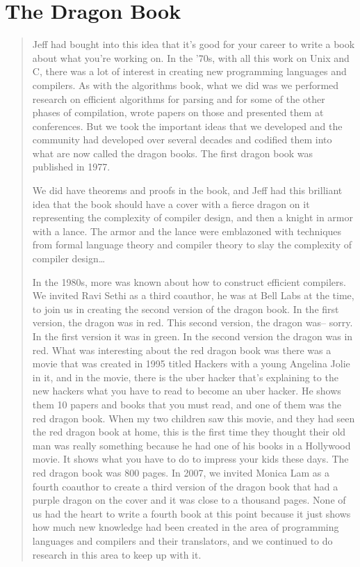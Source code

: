 
\section{The Dragon Book}

\begin{quotation}
Jeff had bought into this idea that it's good for your career to write a book about what you're working
on. In the '70s, with all this work on Unix and C, there was a lot of interest in creating new programming
languages and compilers. As with the algorithms book, what we did was we performed research on
efficient algorithms for parsing and for some of the other phases of compilation, wrote papers on those
and presented them at conferences. But we took the important ideas that we developed and the
community had developed over several decades and codified them into what are now called the dragon
books. The first dragon book was published in 1977. 

We did have theorems and proofs in the book, and Jeff had this brilliant idea that
the book should have a cover with a fierce dragon on it representing the complexity of compiler design,
and then a knight in armor with a lance. The armor and the lance were emblazoned with techniques from
formal language theory and compiler theory to slay the complexity of compiler design\dots

In the 1980s, more was known
about how to construct efficient compilers. We invited Ravi Sethi as a third coauthor, he was at Bell Labs
at the time, to join us in creating the second version of the dragon book. In the first version, the dragon
was in red. This second version, the dragon was-- sorry. In the first version it was in green. In the second
version the dragon was in red. What was interesting about the red dragon book was there was a movie
that was created in 1995 titled Hackers with a young Angelina Jolie in it, and in the movie, there is the
uber hacker that's explaining to the new hackers what you have to read to become an uber hacker. He
shows them 10 papers and books that you must read, and one of them was the red dragon book. When
my two children saw this movie, and they had seen the red dragon book at home, this is the first time they
thought their old man was really something because he had one of his books in a Hollywood movie. It
shows what you have to do to impress your kids these days. The red dragon book was 800 pages. In
2007, we invited Monica Lam as a fourth coauthor to create a third version of the dragon book that had a
purple dragon on the cover and it was close to a thousand pages. None of us had the heart to write a
fourth book at this point because it just shows how much new knowledge had been created in the area of
programming languages and compilers and their translators, and we continued to do research in this area
to keep up with it.
\cite{aho_oral_history_2022}
\end{quotation}

